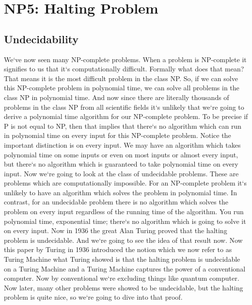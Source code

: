 \section{NP5: Halting Problem}

\subsection{Undecidability}
We`ve now seen many NP-complete problems.
When a problem is NP-complete it signifies to us that it`s computationally difficult.
Formally what does that mean? That means it is the most difficult problem in the class NP\@.
So, if we can solve this NP-complete problem in polynomial time, we can solve all problems in the class NP in polynomial time.
And now since there are literally thousands of problems in the class NP from all scientific fields it`s unlikely that we`re going to derive a polynomial time algorithm for our NP-complete problem.
To be precise if P is not equal to NP, then that implies that there`s no algorithm which can run in polynomial time on every input for this NP-complete problem.
Notice the important distinction is on every input.
We may have an algorithm which takes polynomial time on some inputs or even on most inputs or almost every input, but there`s no algorithm which is guaranteed to take polynomial time on every input.
Now we`re going to look at the class of undecidable problems.
These are problems which are computationally impossible.
For an NP-complete problem it`s unlikely to have an algorithm which solves the problem in polynomial time.
In contrast, for an undecidable problem there is no algorithm which solves the problem on every input regardless of the running time of the algorithm.
You run polynomial time, exponential time; there`s no algorithm which is going to solve it on every input.
Now in 1936 the great Alan Turing proved that the halting problem is undecidable.
And we`re going to see the idea of that result now.
Now this paper by Turing in 1936 introduced the notion which we now refer to as Turing Machine what Turing showed is that the halting problem is undecidable on a Turing Machine and a Turing Machine captures the power of a conventional computer.
Now by conventional we`re excluding things like quantum computer.
Now later, many other problems were showed to be undecidable, but the halting problem is quite nice, so we`re going to dive into that proof.

